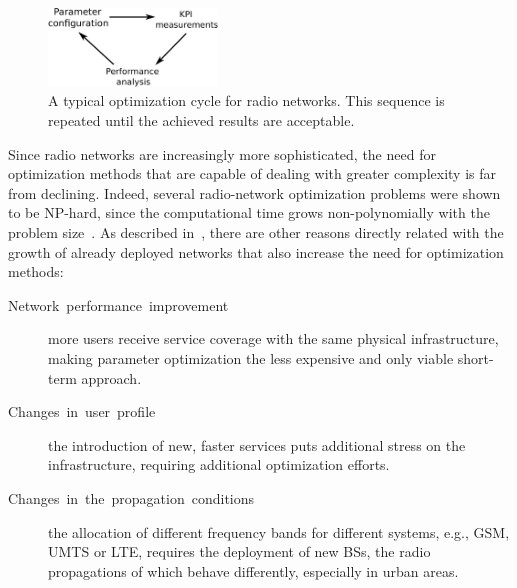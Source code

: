\begin{figure}[h]
\centering

\includegraphics[width=0.4\textwidth]{02-background_and_motivation/img/optimization_cycle}

\caption{A typical optimization cycle for radio networks. This sequence is
repeated until the achieved results are acceptable. \label{fig:Optimization-cycle}}
\end{figure}


\bigskip{}


Since radio networks are increasingly more sophisticated, the need
for optimization methods that are capable of dealing with greater
complexity is far from declining. Indeed, several radio-network optimization
problems were shown to be NP-hard, since the computational time grows
non-polynomially with the problem size~\cite{Amaldi-Planning_UMTS_base_station_locations:2003,Amaldi-Radio_planning_and_coverage_optimization_of_3G_networks:2008,Gordejuela-LTE_access_network_planning_and_optimization:2009,Han-Optimizing_cell_size_for_energy_saving_in_cellular_networks:2012,Lee-Proportional_fair_frequency_domain_packet_scheduling_for_LTE_uplink:2009,Razavi-Performance_improvement_of_LTE_tracking_area_design:2008,Siomina:Minimum.pilot.power.for.service.coverage}.
As described in~\cite{Nawrocki-Understanding_UMTS_radio_network_modelling_and_optimisation:2006},
there are other reasons directly related with the growth of already
deployed networks that also increase the need for optimization methods:
\begin{description}
\item [{Network~performance~improvement}] more users receive service
coverage with the same physical infrastructure, making parameter optimization
the less expensive and only viable short-term approach.
\item [{Changes~in~user~profile}] the introduction of new, faster services
puts additional stress on the infrastructure, requiring additional
optimization efforts.
\item [{Changes~in~the~propagation~conditions}] the allocation of different
frequency bands for different systems, e.g., GSM, UMTS or LTE, requires
the deployment of new BSs, the radio propagations of which behave
differently, especially in urban areas.
\end{description}
